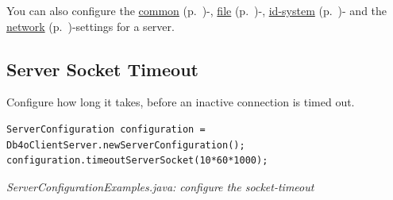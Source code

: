 You can also configure the \hyperref[ref:configuration-common-configuration]{common} (p.~\pageref{ref:configuration-common-configuration})-, \hyperref[ref:configuration-file-configuration]{file} (p.~\pageref{ref:configuration-file-configuration})-, \hyperref[ref:configuration-id-system]{id-system} (p.~\pageref{ref:configuration-id-system})- and the \hyperref[ref:configuration-network-configuration]{network} (p.~\pageref{ref:configuration-network-configuration})-settings for a server.

\subsection*{Server Socket Timeout}

Configure how long it takes, before an inactive connection is timed out.

\begin{lstlisting}
ServerConfiguration configuration = Db4oClientServer.newServerConfiguration();
configuration.timeoutServerSocket(10*60*1000);
\end{lstlisting}

{\small\itshape ServerConfigurationExamples.java: configure the socket-timeout\par}
\medskip

